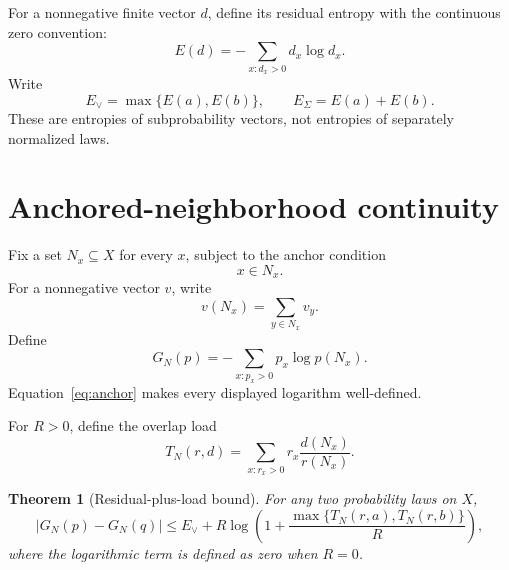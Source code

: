 \documentclass[11pt]{article}
\newtheorem{theorem}{Theorem}[section]
\theoremstyle{definition}
\begin{document}
For a nonnegative finite vector \(d\), define its residual entropy with the continuous zero
convention:
\begin{equation}
  E(d)=-\sum_{x:d_x>0}d_x\log d_x.
\end{equation}
Write
\begin{equation}
  E_\vee=\max\{E(a),E(b)\},
  \qquad
  E_\Sigma=E(a)+E(b).
\end{equation}
These are entropies of subprobability vectors, not entropies of separately normalized laws.

\section{Anchored-neighborhood continuity}

Fix a set \(N_x\subseteq X\) for every \(x\), subject to the anchor condition
\begin{equation}\label{eq:anchor}
  x\in N_x.
\end{equation}
For a nonnegative vector \(v\), write
\begin{equation}
  v(N_x)=\sum_{y\in N_x}v_y.
\end{equation}
Define
\begin{equation}\label{eq:G}
  G_N(p)=-\sum_{x:p_x>0}p_x\log p(N_x).
\end{equation}
Equation~\eqref{eq:anchor} makes every displayed logarithm well-defined.

For \(R>0\), define the overlap load
\begin{equation}\label{eq:T}
  T_N(r,d)
  =
  \sum_{x:r_x>0}
  r_x\frac{d(N_x)}{r(N_x)}.
\end{equation}

\begin{theorem}[Residual-plus-load bound]\label{thm:generic}
For any two probability laws on \(X\),
\begin{equation}\label{eq:generic-bound}
  |G_N(p)-G_N(q)|
  \le
  E_\vee+
  R\log\!\left(
    1+\frac{\max\{T_N(r,a),T_N(r,b)\}}{R}
  \right),
\end{equation}
where the logarithmic term is defined as zero when \(R=0\).
\end{theorem}
\end{document}
